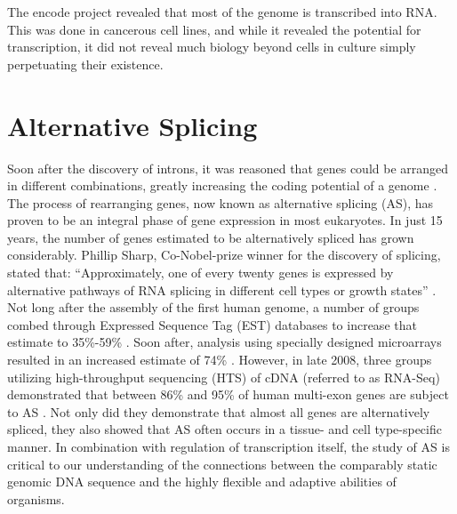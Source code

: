 
The encode project revealed that most of the genome is transcribed into RNA. This was done in cancerous cell lines, and while it revealed the potential for transcription, it did not reveal much biology beyond cells in culture simply perpetuating their existence. 

\section{Alternative Splicing}





Soon after the discovery of introns, it was reasoned that genes could be arranged in different combinations, greatly increasing the coding potential of a genome \citep{Gilbert1978a}. The process of rearranging genes, now known as alternative splicing (AS), has proven to be an integral phase of gene expression in most eukaryotes. In just 15 years, the number of genes estimated to be alternatively spliced has grown considerably. Phillip Sharp, Co-Nobel-prize winner for the discovery of splicing, stated that: “Approximately, one of every twenty genes is expressed by alternative pathways of RNA splicing in different cell types or growth states” \cite{Sharp2014}. Not long after the assembly of the first human genome, a number of groups combed through Expressed Sequence Tag (EST) databases to increase that estimate to 35\%-59\% \citep{Modrek2002}. Soon after, analysis using specially designed microarrays resulted in an increased estimate of 74\% \citep{Johnson2003}. However, in late 2008, three groups utilizing high-throughput sequencing (HTS) of cDNA (referred to as RNA-Seq) demonstrated that between 86\% and 95\% of human multi-exon genes are subject to AS \citep{Pan2008, Wang2008, Sultan2008}. Not only did they demonstrate that almost all genes are alternatively spliced, they also showed that AS often occurs in a tissue- and cell type-specific manner. In combination with regulation of transcription itself, the study of AS is critical to our understanding of the connections between the comparably static genomic DNA sequence and the highly flexible and adaptive abilities of organisms.

